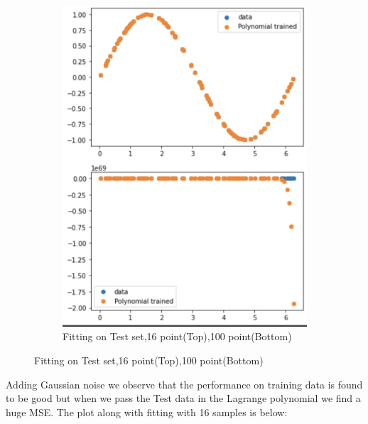 \documentclass[a4paper]{article}
\theoremstyle{definition}
\newenvironment{soln}{
    \leavevmode\color{blue}\ignorespaces
}{}
\begin{document}
\begin{soln}
\begin{figure}[H]
\begin{subfigure}{0.5\textwidth}
            \label{fig:q2}
            \end{subfigure}%
             \begin{subfigure}{0.5\textwidth}
            \centering
            \includegraphics[scale=0.5]{test.png}
            \caption{Fitting on Test set,16 point(Top),100 point(Bottom)}
            \label{fig:q2}
                \end{subfigure}
        \end{figure}
        Adding Gaussian noise we observe that the performance on training data is found to be good but when we pass the Test data in the Lagrange polynomial we find a huge MSE. The plot along with fitting with 16 samples is below:\\
        \begin{figure}[H]
        \begin{subfigure}{0.5\textwidth}
            \centering

\end{subfigure}
\end{figure}
\end{soln}
\end{document}
